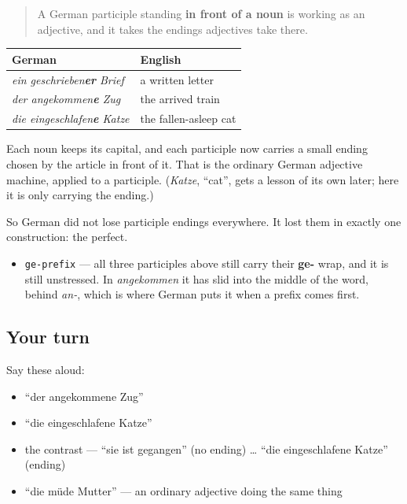 \begin{grammarlens}[title={Grammar Lens: in front of a noun, it inflects}]
\begin{quote}
A German participle standing \textbf{in front of a noun} is working as an adjective, and it takes the endings adjectives take there.
\end{quote}

\noindent
\begin{tabularx}{\linewidth}{@{}>{\raggedright\arraybackslash}X>{\raggedright\arraybackslash}X@{}}
\toprule
\textbf{German} & \textbf{English} \\
\midrule
\emph{ein geschrieben\textbf{er} Brief} & a written letter \\
\emph{der angekommen\textbf{e} Zug} & the arrived train \\
\emph{die eingeschlafen\textbf{e} Katze} & the fallen-asleep cat \\
\bottomrule
\end{tabularx}

Each noun keeps its capital, and each participle now carries a small ending chosen by the article in front of it. That is the ordinary German adjective machine, applied to a participle. (\emph{Katze}, \textquotedblleft{}cat\textquotedblright{}, gets a lesson of its own later; here it is only carrying the ending.)

So German did not lose participle endings everywhere. It lost them in exactly one construction: the perfect.
\end{grammarlens}

\begin{sounds}
\begin{itemize}
\raggedright
  \item \texttt{ge-prefix} — all three participles above still carry their \textbf{ge-} wrap, and it is still unstressed. In \emph{angekommen} it has slid into the middle of the word, behind \emph{an-}, which is where German puts it when a prefix comes first.
\end{itemize}
\end{sounds}

\subsection*{Your turn}
Say these aloud:

\begin{itemize}
\raggedright
  \item \textquotedblleft{}der angekommene Zug\textquotedblright{}
  \item \textquotedblleft{}die eingeschlafene Katze\textquotedblright{}
  \item the contrast — \textquotedblleft{}sie ist gegangen\textquotedblright{} (no ending) … \textquotedblleft{}die eingeschlafene Katze\textquotedblright{} (ending)
  \item \textquotedblleft{}die müde Mutter\textquotedblright{} — an ordinary adjective doing the same thing
\end{itemize}

